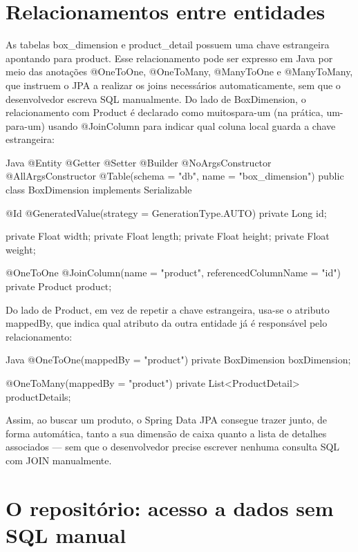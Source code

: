 \section{Relacionamentos entre entidades}

As tabelas box\_dimension e product\_detail possuem uma chave estrangeira apontando para product. Esse relacionamento pode ser expresso em Java por meio das anotações @OneToOne, @OneToMany, @ManyToOne e @ManyToMany, que instruem o JPA a realizar os joins necessários automaticamente, sem que o desenvolvedor escreva SQL manualmente. Do lado de BoxDimension, o relacionamento com Product é declarado como muitospara-um (na prática, um-para-um) usando @JoinColumn para indicar qual coluna local guarda a chave estrangeira:

\begin{codebox}{Java}
 @Entity
 @Getter
 @Setter
 @Builder
 @NoArgsConstructor
 @AllArgsConstructor
 @Table(schema = "db", name = "box_dimension")
 public class BoxDimension implements Serializable {

        @Id
        @GeneratedValue(strategy = GenerationType.AUTO)
        private Long id;

        private Float width;
        private Float length;
        private Float height;
        private Float weight;



       @OneToOne
       @JoinColumn(name = "product", referencedColumnName = "id")
       private Product product;
}
\end{codebox}

Do lado de Product, em vez de repetir a chave estrangeira, usa-se o atributo mappedBy, que indica qual atributo da outra entidade já é responsável pelo relacionamento:

\begin{codebox}{Java}
@OneToOne(mappedBy = "product")
private BoxDimension boxDimension;

@OneToMany(mappedBy = "product")
private List<ProductDetail> productDetails;
\end{codebox}

Assim, ao buscar um produto, o Spring Data JPA consegue trazer junto, de forma automática, tanto a sua dimensão de caixa quanto a lista de detalhes associados — sem que o desenvolvedor precise escrever nenhuma consulta SQL com JOIN manualmente.

\section{O repositório: acesso a dados sem SQL manual}

